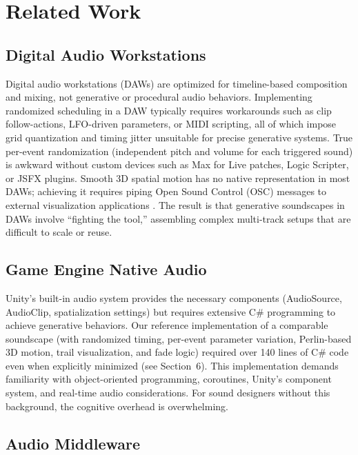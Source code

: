 \documentclass[sigconf,anonymous,review]{nimeart}
\begin{document}
\section{Related Work}

\subsection{Digital Audio Workstations}

Digital audio workstations (DAWs) are optimized for timeline-based composition and mixing, not generative or procedural audio behaviors. Implementing randomized scheduling in a DAW typically requires workarounds such as clip follow-actions, LFO-driven parameters, or MIDI scripting, all of which impose grid quantization and timing jitter unsuitable for precise generative systems. True per-event randomization (independent pitch and volume for each triggered sound) is awkward without custom devices such as Max for Live patches, Logic Scripter, or JSFX plugins. Smooth 3D spatial motion has no native representation in most DAWs; achieving it requires piping Open Sound Control (OSC) messages to external visualization applications \cite{collins2009introduction}. The result is that generative soundscapes in DAWs involve ``fighting the tool,'' assembling complex multi-track setups that are difficult to scale or reuse.

\subsection{Game Engine Native Audio}

Unity's built-in audio system provides the necessary components (AudioSource, AudioClip, spatialization settings) but requires extensive C\# programming to achieve generative behaviors. Our reference implementation of a comparable soundscape (with randomized timing, per-event parameter variation, Perlin-based 3D motion, trail visualization, and fade logic) required over 140 lines of C\# code even when explicitly minimized (see Section~6). This implementation demands familiarity with object-oriented programming, coroutines, Unity's component system, and real-time audio considerations. For sound designers without this background, the cognitive overhead is overwhelming.

\subsection{Audio Middleware}
\end{document}
